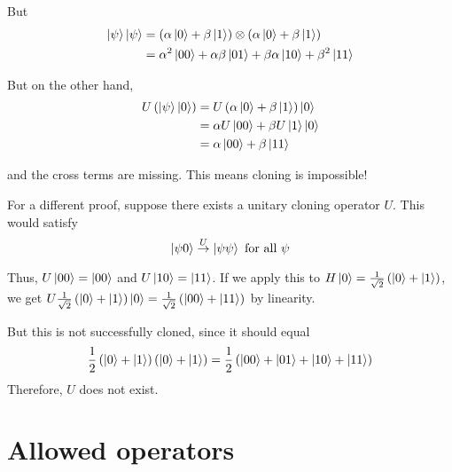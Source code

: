 \documentclass[12pt, english]{book}
\begin{document}
But 
\begin{align*}
	\ket{\psi} \ket{\psi} &= \left( \alpha \ket{0} + \beta \ket{1} \right) \otimes \left( \alpha \ket{0} + \beta \ket{1} \right) \\
	&= \alpha^2 \ket{00} + \alpha \beta \ket{01} + \beta \alpha \ket{10} + \beta^2 \ket{11}
\end{align*}

But on the other hand, 
\begin{align*}
	U \left( \ket{\psi} \ket{0} \right) &= U \left( \alpha \ket{0} + \beta \ket{1} \right) \ket{0} \\ 
	&= \alpha U \ket{00} + \beta U \ket{1} \ket{0} \\
	&= \alpha \ket{00} + \beta \ket{11}
\end{align*}

and the cross terms are missing.
This means cloning is impossible! 

For a different proof, suppose there exists a unitary cloning operator $U$.
This would satisfy 
\[ \ket{\psi 0} \stackrel{U}{\rightarrow} \ket{\psi \psi}\ \text{for all}\ \psi \]

Thus, $U \ket{00} = \ket{00}$ and $U\ket{10} = \ket{11}$.
If we apply this to $H \ket{0} = \frac{1}{\sqrt{2}} \left( \ket{0} + \ket{1} \right)$, we get $U \frac{1}{\sqrt{2}} \left( \ket{0} + \ket{1} \right) \ket{0} = \frac{1}{\sqrt{2}} \left( \ket{00} + \ket{11} \right)$ by linearity.

But this is not successfully cloned, since it should equal
\[ \frac{1}{2} \left( \ket{0} + \ket{1} \right) \left( \ket{0} + \ket{1} \right) = \frac{1}{2} \left( \ket{00} + \ket{01} + \ket{10} + \ket{11} \right) \]
Therefore, $U$ does not exist.


\section{Allowed operators}
\end{document}
